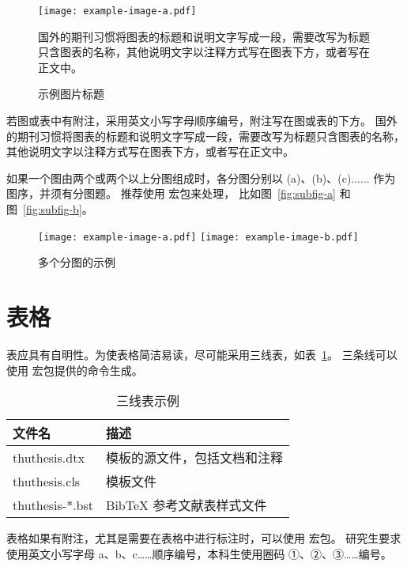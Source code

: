 \begin{figure}
  \centering
  \texttt{[image: example-image-a.pdf]}
  \caption*{国外的期刊习惯将图表的标题和说明文字写成一段，需要改写为标题只含图表的名称，其他说明文字以注释方式写在图表下方，或者写在正文中。}
  \caption{示例图片标题}
  \label{fig:example}
\end{figure}

若图或表中有附注，采用英文小写字母顺序编号，附注写在图或表的下方。
国外的期刊习惯将图表的标题和说明文字写成一段，需要改写为标题只含图表的名称，其他说明文字以注释方式写在图表下方，或者写在正文中。

如果一个图由两个或两个以上分图组成时，各分图分别以 (a)、(b)、(c)...... 作为图序，并须有分图题。
推荐使用  宏包来处理， 比如图~\ref{fig:subfig-a} 和图~\ref{fig:subfig-b}。

\begin{figure}
  \centering
    {\texttt{[image: example-image-a.pdf]}}
    {\texttt{[image: example-image-b.pdf]}}
  \caption{多个分图的示例}
  \label{fig:multi-image}
\end{figure}



\section{表格}

表应具有自明性。为使表格简洁易读，尽可能采用三线表，如表~\ref{tab:three-line}。
三条线可以使用  宏包提供的命令生成。

\begin{table}
  \centering
  \caption{三线表示例}
  \begin{tabular}{ll}
    \toprule
    文件名          & 描述                         \\
    \midrule
    thuthesis.dtx   & 模板的源文件，包括文档和注释 \\
    thuthesis.cls   & 模板文件                     \\
    thuthesis-*.bst & BibTeX 参考文献表样式文件    \\
    \bottomrule
  \end{tabular}
  \label{tab:three-line}
\end{table}

表格如果有附注，尤其是需要在表格中进行标注时，可以使用  宏包。
研究生要求使用英文小写字母 a、b、c……顺序编号，本科生使用圈码 ①、②、③……编号。

